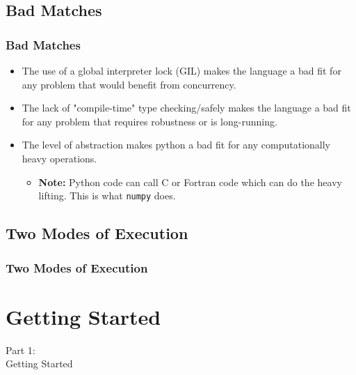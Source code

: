 \subsection{Bad Matches}
\begin{frame}
    \frametitle{Bad Matches}
    \vspace{5mm}
    
    \pause
    \begin{itemize}
      \item The use of a global interpreter lock (GIL) makes the language a bad fit for any problem that would benefit from concurrency.
      \pause
      \item The lack of "compile-time" type checking/safely makes the language a bad fit for any problem that requires robustness or is long-running.
      \pause
      \item The level of abstraction makes python a bad fit for any computationally heavy operations.
      \pause
          \begin{itemize}
              \item \textbf{Note:} Python code can call C or Fortran code which can do the heavy lifting. This is what \texttt{numpy} does.
          \end{itemize}
    \end{itemize}
\end{frame}

\subsection{Two Modes of Execution}
\begin{frame}
    \frametitle{Two Modes of Execution}
    \vspace{5mm}
    
\end{frame}


\section{Getting Started}
\begin{frame}
    \vspace{25mm}
    \begin{center}
        \Huge{Part 1:\\Getting Started}
    \end{center}
\end{frame}


